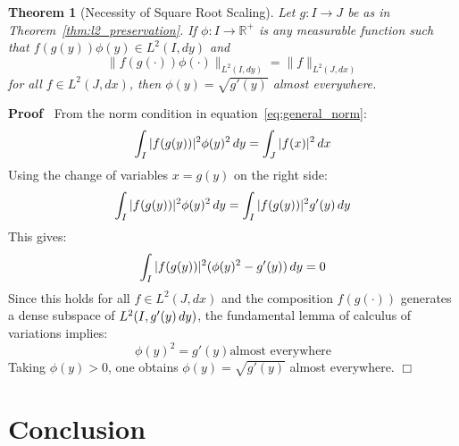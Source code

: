 \documentclass{article}
\newenvironment{proof}{\noindent\textbf{Proof\ }}{\hspace*{\fill}$\Box$\medskip}
\newtheorem{theorem}{Theorem}
\begin{document}
\begin{theorem}[Necessity of Square Root Scaling]
  \label{thm:necessity}Let $g : I \to J$ be as in
  Theorem~\ref{thm:l2_preservation}. If $\phi : I \to \mathbb{R}^+$ is any
  measurable function such that $f (g (y)) \phi (y) \in L^2 (I, dy)$ and
  \begin{equation}
    \label{eq:general_norm} \|f (g (\cdot)) \phi (\cdot)\|_{L^2 (I, dy)} =
    \|f\|_{L^2 (J, dx)}
  \end{equation}
  for all $f \in L^2 (J, dx)$, then $\phi (y) = \sqrt{g' (y)}$ almost
  everywhere.
\end{theorem}

\begin{proof}
  From the norm condition in equation~\eqref{eq:general_norm}:
  \begin{equation}
    \label{eq:phi_condition} \int_I |f (g (y)) |^2 \phi (y)^2  \hspace{0.17em}
    dy = \int_J |f (x) |^2  \hspace{0.17em} dx
  \end{equation}
  Using the change of variables $x = g (y)$ on the right side:
  \begin{equation}
    \label{eq:phi_comparison} \int_I |f (g (y)) |^2 \phi (y)^2 
    \hspace{0.17em} dy = \int_I |f (g (y)) |^2 g' (y)  \hspace{0.17em} dy
  \end{equation}
  This gives:
  \begin{equation}
    \label{eq:phi_difference} \int_I |f (g (y)) |^2  (\phi (y)^2 - g' (y)) 
    \hspace{0.17em} dy = 0
  \end{equation}
  Since this holds for all $f \in L^2 (J, dx)$ and the composition $f (g
  (\cdot))$ generates a dense subspace of $L^2 (I, g' (y) \hspace{0.17em}
  dy)$, the fundamental lemma of calculus of variations implies:
  \begin{equation}
    \label{eq:phi_ae_equal} \phi (y)^2 = g' (y) \text{almost everywhere}
  \end{equation}
  Taking $\phi (y) > 0$, one obtains $\phi (y) = \sqrt{g' (y)}$ almost
  everywhere.
\end{proof}

\section{Conclusion}
\end{document}
